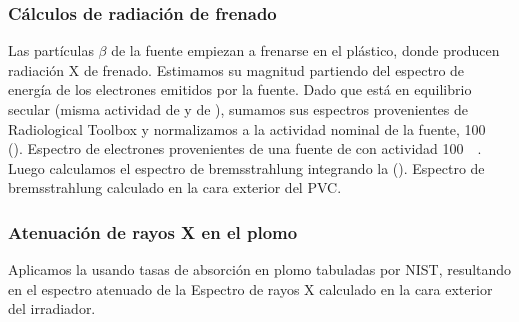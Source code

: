 \subsubsection{Cálculos de radiación de frenado}
Las partículas $\beta$ de la fuente empiezan a frenarse en el plástico,
donde producen radiación X de frenado.
Estimamos su magnitud partiendo del espectro de energía de los
electrones emitidos por la fuente.
Dado que está en equilibrio secular 
(misma actividad de \Strontium y de \Yttrium),
sumamos sus espectros provenientes de 
Radiological Toolbox\cite{eckerman2006radiological}
y normalizamos a la actividad nominal de la fuente, \SI{100}{\milli\curie}
().
{Espectro de electrones provenientes de una fuente de
\Strontium con actividad \SI{100}{\milli\curie}\cite{eckerman_icrp_2007}.}
Luego calculamos el espectro de bremsstrahlung integrando la 
().
{Espectro de bremsstrahlung calculado en la cara exterior del PVC.}
%
\subsubsection{Atenuación de rayos X en el plomo}
Aplicamos la  
usando tasas de absorción en plomo tabuladas por NIST\cite{xraycoef},
resultando en el espectro atenuado de la 
{Espectro de rayos X calculado en la cara exterior del irradiador.}
%
%
